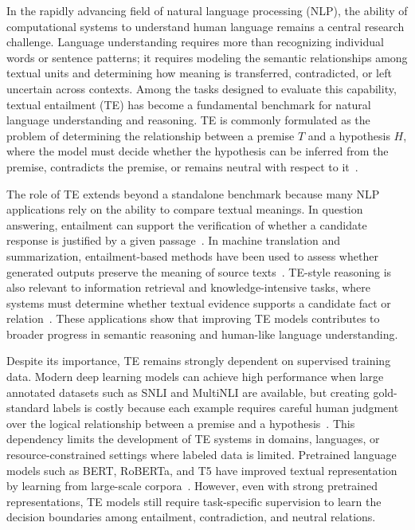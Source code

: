 \documentclass[11pt]{article}
\begin{document}
In the rapidly advancing field of natural language processing (NLP), the ability of computational systems to understand human language remains a central research challenge. Language understanding requires more than recognizing individual words or sentence patterns; it requires modeling the semantic relationships among textual units and determining how meaning is transferred, contradicted, or left uncertain across contexts. Among the tasks designed to evaluate this capability, textual entailment (TE) has become a fundamental benchmark for natural language understanding and reasoning. TE is commonly formulated as the problem of determining the relationship between a premise $T$ and a hypothesis $H$, where the model must decide whether the hypothesis can be inferred from the premise, contradicts the premise, or remains neutral with respect to it~\cite{dagan2006pascal,bowman2015large,williams2018broad}.

The role of TE extends beyond a standalone benchmark because many NLP applications rely on the ability to compare textual meanings. In question answering, entailment can support the verification of whether a candidate response is justified by a given passage~\cite{harabagiu2006methods,androutsopoulos2010survey}. In machine translation and summarization, entailment-based methods have been used to assess whether generated outputs preserve the meaning of source texts~\cite{pado2009textual,mehdad2013using}. TE-style reasoning is also relevant to information retrieval and knowledge-intensive tasks, where systems must determine whether textual evidence supports a candidate fact or relation~\cite{dagan2006pascal,bowman2015large}. These applications show that improving TE models contributes to broader progress in semantic reasoning and human-like language understanding.

Despite its importance, TE remains strongly dependent on supervised training data. Modern deep learning models can achieve high performance when large annotated datasets such as SNLI and MultiNLI are available, but creating gold-standard labels is costly because each example requires careful human judgment over the logical relationship between a premise and a hypothesis~\cite{bowman2015large,williams2018broad}. This dependency limits the development of TE systems in domains, languages, or resource-constrained settings where labeled data is limited. Pretrained language models such as BERT, RoBERTa, and T5 have improved textual representation by learning from large-scale corpora~\cite{devlin2019bert,liu2019roberta,raffel2020exploring}. However, even with strong pretrained representations, TE models still require task-specific supervision to learn the decision boundaries among entailment, contradiction, and neutral relations.
\end{document}
